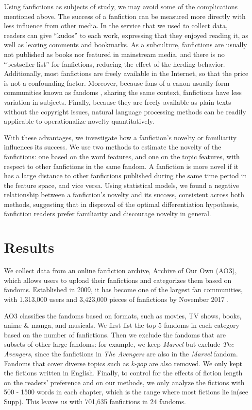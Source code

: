 \documentclass[letterpaper]{article} %
\begin{document}
Using fanfictions as subjects of study, we may avoid some of the complications mentioned above. The success of a fanfiction can be measured more directly with less influence from other media. In the service that we used to collect data, readers can give ``kudos'' to each work, expressing that they enjoyed reading it, as well as leaving comments and bookmarks. As a subculture, fanfictions are usually not published as books nor featured in mainstream media, and there is no ``bestseller list'' for fanfictions, reducing the effect of the herding behavior. Additionally, most fanfictions are freely available in the Internet, so that the price is not a confounding factor. Moreover, because fans of a canon usually form communities known as fandoms \cite{wiki:fandom}, sharing the same context, fanfictions have less variation in subjects. Finally, because they are freely available as plain texts without the copyright issues, natural language processing methods can be readily applicable to operationalize novelty quantitatively.

With these advantages, we investigate how a fanfiction's novelty or familiarity influences its success. We use two methods to estimate the novelty of the fanfictions: one based on the word features, and one on the topic features, with respect to other fanfictions in the same fandom. A fanfiction is more novel if it has a large distance to other fanfictions published during the same time period in the feature space, and vice versa. Using statistical models, we found a negative relationship between a fanfiction's novelty and its success, consistent across both methods, suggesting that in disproval of the optimal differentiation hypothesis, fanfiction readers prefer familiarity and discourage novelty in general.


\section{Results} 
We collect data from an online fanfiction archive, Archive of Our Own (AO3), which allows users to upload their fanfictions and categorizes them based on fandoms. Established in 2009, it has become one of the largest fan communities, with 1,313,000 users and 3,423,000 pieces of fanfictions by November 2017 \cite{ao3stats}.

AO3 classifies the fandoms based on formats, such as movies, TV shows, books, anime \& manga, and musicals. We first list the top 5 fandoms in each category based on the number of fanfictions. Then we exclude the fandoms that are subsets of other large fandoms: for example, we keep \emph{Marvel} but exclude \emph{The Avengers}, since the fanfictions in \emph{The Avengers} are also in the \emph{Marvel} fandom. Fandoms that cover diverse topics such as \emph{k-pop} are also removed. We only kept the fictions written in English. Finally, to control for the effects of fiction length on the readers' preference and on our methods, we only analyze the fictions with 500 - 1500 words in each chapter, which is the range where most fictions lie in(see Supp). This leaves us with 701,635 fanfictions in 24 fandoms. 
\end{document}
